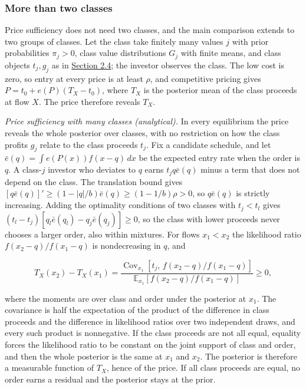 \subsubsection{More than two classes}\label{more-than-two-classes}

Price sufficiency does not need two classes, and the main comparison
extends to two groups of classes. Let the class take finitely many
values \(j\) with prior probabilities \(\pi_j>0\), class value
distributions \(G_j\) with finite means, and class objects \(t_j,g_j\)
as in \hyperref[sec-equilibrium]{Section 2.4}; the investor observes
the class. The low cost is zero, so entry at every price is at least
\(\rho\), and competitive pricing gives \(P=t_0+e(P)(T_X-t_0)\), where
\(T_X\) is the posterior mean of the class proceeds at flow \(X\). The
price therefore reveals \(T_X\).

\emph{Price sufficiency with many classes (analytical).} In every
equilibrium the price reveals the whole posterior over classes, with no
restriction on how the class profits \(g_j\) relate to the class
proceeds \(t_j\). Fix a candidate schedule, and let
\(\bar e(q)=\int e(P(x))f(x-q)\,dx\) be the expected entry rate when the
order is \(q\). A class-\(j\) investor who deviates to \(q\) earns
\(t_jq\bar e(q)\) minus a term that does not depend on the class. The
translation bound gives
\([q\bar e(q)]'\ge(1-|q|/b)\bar e(q)\ge(1-1/b)\rho>0\), so
\(q\bar e(q)\) is strictly increasing. Adding the optimality conditions
of two classes with \(t_j<t_l\) gives
\((t_l-t_j)[q_l\bar e(q_l)-q_j\bar e(q_j)]\ge0\), so the class with
lower proceeds never chooses a larger order, also within mixtures. For
flows \(x_1<x_2\) the likelihood ratio \(f(x_2-q)/f(x_1-q)\) is
nondecreasing in \(q\), and

\[
T_X(x_2)-T_X(x_1)
=\frac{\operatorname{Cov}_{x_1}\!\left[t_j,\,f(x_2-q)/f(x_1-q)\right]}
{\mathbb E_{x_1}\!\left[f(x_2-q)/f(x_1-q)\right]}\ge0,
\]

where the moments are over class and order under the posterior at
\(x_1\). The covariance is half the expectation of the product of the
difference in class proceeds and the difference in likelihood ratios
over two independent draws, and every such product is nonnegative. If
the class proceeds are not all equal, equality forces the likelihood
ratio to be constant on the joint support of class and order, and then
the whole posterior is the same at \(x_1\) and \(x_2\). The posterior is
therefore a measurable function of \(T_X\), hence of the price. If all
class proceeds are equal, no order earns a residual and the posterior
stays at the prior.

